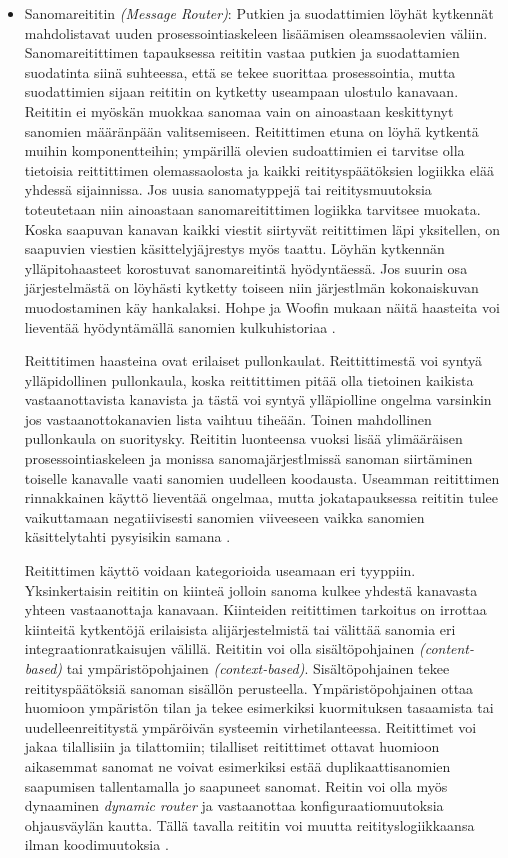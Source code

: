 \begin{itemize}
   \newpage
   \item Sanomareititin \textit{(Message Router)}:
      Putkien ja suodattimien löyhät kytkennät mahdolistavat uuden prosessointiaskeleen lisäämisen oleamssaolevien väliin. 
      Sanomareitittimen tapauksessa reititin vastaa putkien ja suodattamien suodatinta siinä suhteessa, että se tekee suorittaa prosessointia, mutta suodattimien sijaan reititin on kytketty useampaan ulostulo kanavaan. Reititin ei myöskän muokkaa sanomaa vain on ainoastaan keskittynyt sanomien määränpään valitsemiseen.
      Reitittimen etuna on löyhä kytkentä muihin komponentteihin; ympärillä olevien sudoattimien ei tarvitse olla tietoisia reittittimen olemassaolosta ja kaikki reitityspäätöksien logiikka elää yhdessä sijainnissa. Jos uusia sanomatyppejä tai reititysmuutoksia toteutetaan niin ainoastaan sanomareitittimen logiikka tarvitsee muokata. Koska saapuvan kanavan kaikki viestit siirtyvät reitittimen läpi yksitellen, on saapuvien viestien käsittelyjäjrestys myös taattu.
      Löyhän kytkennän ylläpitohaasteet korostuvat sanomareitintä hyödyntäessä. Jos suurin osa järjestelmästä on löyhästi kytketty toiseen niin järjestlmän kokonaiskuvan muodostaminen käy hankalaksi. Hohpe ja Woofin mukaan näitä haasteita voi lieventää hyödyntämällä sanomien kulkuhistoriaa \citep[sivu~93]{Hohpe2004}.


      Reittitimen haasteina ovat erilaiset pullonkaulat. Reittittimestä voi syntyä ylläpidollinen pullonkaula, koska reittittimen pitää olla tietoinen kaikista vastaanottavista kanavista ja tästä voi syntyä ylläpiolline ongelma varsinkin jos vastaanottokanavien lista vaihtuu tiheään. Toinen mahdollinen pullonkaula on suoritysky. Reititin luonteensa vuoksi lisää ylimääräisen prosessointiaskeleen ja monissa sanomajärjestlmissä sanoman siirtäminen toiselle kanavalle vaati sanomien uudelleen koodausta. Useamman reitittimen rinnakkainen käyttö lieventää ongelmaa, mutta jokatapauksessa reititin tulee vaikuttamaan negatiivisesti sanomien viiveeseen vaikka sanomien käsittelytahti pysyisikin samana \citep[sivu~93]{Hohpe2004}.


      Reitittimen käyttö voidaan kategorioida useamaan eri tyyppiin. Yksinkertaisin reititin on kiinteä jolloin sanoma kulkee yhdestä kanavasta yhteen vastaanottaja kanavaan. Kiinteiden reitittimen tarkoitus on irrottaa kiinteitä kytkentöjä erilaisista alijärjestelmistä tai välittää sanomia eri integraationratkaisujen välillä.
      Reititin voi olla sisältöpohjainen \textit{(content-based)} tai ympäristöpohjainen \textit{(context-based)}. Sisältöpohjainen tekee reitityspäätöksiä sanoman sisällön perusteella. Ympäristöpohjainen ottaa huomioon ympäristön tilan ja tekee esimerkiksi kuormituksen tasaamista tai uudelleenreititystä ympäröivän systeemin virhetilanteessa.
      Reitittimet voi jakaa tilallisiin ja tilattomiin; tilalliset reitittimet ottavat huomioon aikasemmat sanomat ne voivat esimerkiksi estää duplikaattisanomien saapumisen tallentamalla jo saapuneet sanomat.
      Reitin voi olla myös dynaaminen \textit{dynamic router} ja vastaanottaa konfiguraatiomuutoksia ohjausväylän kautta. Tällä tavalla reititin voi muutta reitityslogiikkaansa ilman koodimuutoksia \citep[sivu~94]{Hohpe2004}.



\end{itemize}

